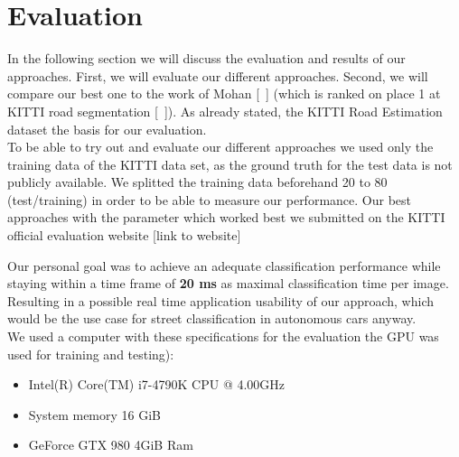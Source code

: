 
\section{Evaluation}\label{sec:evaluation}

In the following section we will discuss the evaluation and results of our approaches. First, we will evaluate our different approaches. Second, we will compare our best one to the work of Mohan [~\cite{Tarel2009}]  (which is ranked on place 1 at KITTI road segmentation [~\cite{Tarel2009}]).
As already stated, the KITTI Road Estimation dataset the basis for our evaluation.\\
To be able to try out and evaluate our different approaches we used only the training data of the KITTI data set, as the ground truth for the test data is not publicly available. We splitted the training data beforehand 20 to 80 (test/training) in order to be able to measure our performance.
Our best approaches with the parameter which worked best we submitted on the KITTI official evaluation website [link to website]


Our personal goal was to achieve an adequate classification performance while staying within a time frame of \textbf{20 ms} as maximal classification time per image. Resulting in a possible real time application usability of our approach, which would be the use case for street classification in autonomous cars anyway.\\

We used a computer with these specifications for the evaluation the GPU was used for training and testing):
\begin{itemize}
\item Intel(R) Core(TM) i7-4790K CPU @ 4.00GHz
\item System memory 16 GiB
\item GeForce GTX 980 4GiB Ram
\end{itemize}

